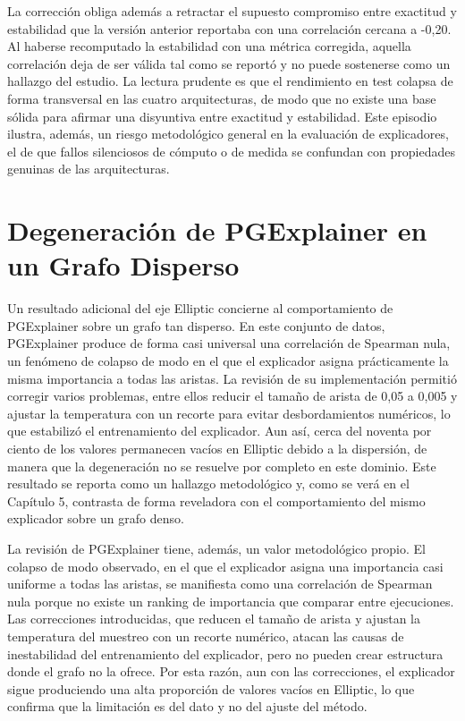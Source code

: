 

La corrección obliga además a retractar el supuesto compromiso entre exactitud y estabilidad que la versión anterior reportaba con una correlación cercana a -0,20. Al haberse recomputado la estabilidad con una métrica corregida, aquella correlación deja de ser válida tal como se reportó y no puede sostenerse como un hallazgo del estudio. La lectura prudente es que el rendimiento en test colapsa de forma transversal en las cuatro arquitecturas, de modo que no existe una base sólida para afirmar una disyuntiva entre exactitud y estabilidad. Este episodio ilustra, además, un riesgo metodológico general en la evaluación de explicadores, el de que fallos silenciosos de cómputo o de medida se confundan con propiedades genuinas de las arquitecturas.

\section{Degeneración de PGExplainer en un Grafo Disperso}

Un resultado adicional del eje Elliptic concierne al comportamiento de PGExplainer sobre un grafo tan disperso. En este conjunto de datos, PGExplainer produce de forma casi universal una correlación de Spearman nula, un fenómeno de colapso de modo en el que el explicador asigna prácticamente la misma importancia a todas las aristas. La revisión de su implementación permitió corregir varios problemas, entre ellos reducir el tamaño de arista de 0,05 a 0,005 y ajustar la temperatura con un recorte para evitar desbordamientos numéricos, lo que estabilizó el entrenamiento del explicador. Aun así, cerca del noventa por ciento de los valores permanecen vacíos en Elliptic debido a la dispersión, de manera que la degeneración no se resuelve por completo en este dominio. Este resultado se reporta como un hallazgo metodológico y, como se verá en el Capítulo 5, contrasta de forma reveladora con el comportamiento del mismo explicador sobre un grafo denso.

La revisión de PGExplainer tiene, además, un valor metodológico propio. El colapso de modo observado, en el que el explicador asigna una importancia casi uniforme a todas las aristas, se manifiesta como una correlación de Spearman nula porque no existe un ranking de importancia que comparar entre ejecuciones. Las correcciones introducidas, que reducen el tamaño de arista y ajustan la temperatura del muestreo con un recorte numérico, atacan las causas de inestabilidad del entrenamiento del explicador, pero no pueden crear estructura donde el grafo no la ofrece. Por esta razón, aun con las correcciones, el explicador sigue produciendo una alta proporción de valores vacíos en Elliptic, lo que confirma que la limitación es del dato y no del ajuste del método.


